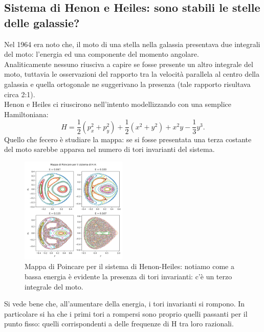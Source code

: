 \subsection{Sistema di Henon e Heiles: sono stabili le stelle delle galassie?}%
\label{sub:Sistema di Henon e Heiles}
Nel 1964 era noto che, il moto di una stella nella galassia presentava due integrali del moto: l'energia ed una componente del momento angolare.\\
Analiticamente nessuno riusciva a capire se fosse presente un altro integrale del moto, tuttavia le osservazioni del rapporto tra la velocità parallela al centro della galassia e quella ortogonale ne suggerivano la presenza (tale rapporto risultava circa 2:1).\\
Henon e Heiles ci riuscirono nell'intento modellizzando con una semplice Hamiltoniana:
\[
    H = \frac{1}{2}(p_x^2+p_y^2) + \frac{1}{2}(x^2+y^2) + x^2y-\frac{1}{3}y^3
.\] 
Quello che fecero è studiare la mappa: se si fosse presentata una terza costante del moto sarebbe apparsa nel numero di tori invarianti del sistema.
\begin{figure}[H]
    \centering
    \includegraphics[width=0.45\textwidth]{figures/18_Henon-Heiles.png}
    \caption{\scriptsize Mappa di Poincare per il sistema di Henon-Heiles: notiamo come a bassa energia è evidente la presenza di tori invarianti: c'è un terzo integrale del moto.}
    \label{fig:}
\end{figure}
\noindent
Si vede bene che, all'aumentare della energia, i tori invarianti si rompono. In particolare si ha che i primi tori a rompersi sono proprio quelli passanti per il punto fisso: quelli corrispondenti a delle frequenze di H tra loro razionali.
